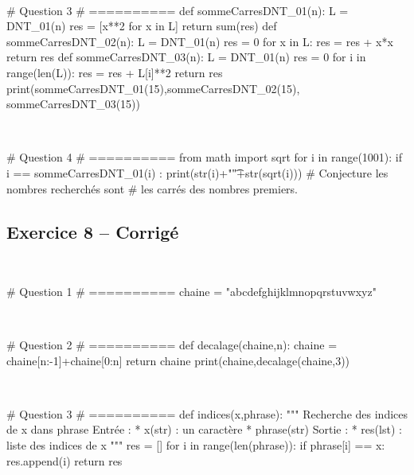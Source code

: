 \documentclass[10pt,fleqn]{article} %
\begin{document}
\begin{multicols}{2}
\begin{corrige}
$\quad$
\begin{python}
# Question 3
# ==========
def sommeCarresDNT_01(n):
    L = DNT_01(n)
    res = [x**2 for x in L]
    return sum(res)
def sommeCarresDNT_02(n):
    L = DNT_01(n)
    res = 0
    for x in L:
        res = res + x*x
    return res
def sommeCarresDNT_03(n):
    L = DNT_01(n)
    res = 0
    for i in range(len(L)):
        res = res + L[i]**2
    return res
print(sommeCarresDNT_01(15),sommeCarresDNT_02(15),
    sommeCarresDNT_03(15))
\end{python}
\end{corrige}


\begin{corrige}
$\quad$
\begin{python}
# Question 4
# ==========
from math import sqrt
for i in range(1001):
    if i == sommeCarresDNT_01(i) :
        print(str(i)+"\t"+str(sqrt(i)))
# Conjecture les nombres recherchés sont 
# les carrés des nombres premiers. 
\end{python}
\end{corrige}


\subsection*{Exercice 8 -- Corrigé}
\begin{corrige}
$\quad$
\begin{python}
# Question 1 
# ==========
chaine = "abcdefghijklmnopqrstuvwxyz"
\end{python}
\end{corrige}

\begin{corrige}
$\quad$
\begin{python}
# Question 2
# ==========
def decalage(chaine,n):
    chaine = chaine[n:-1]+chaine[0:n]
    return chaine
print(chaine,decalage(chaine,3))
\end{python}
\end{corrige}

\begin{corrige}
$\quad$
\begin{python}
# Question 3
# ==========
def indices(x,phrase):
    """
    Recherche des indices de x dans phrase
    Entrée : 
     * x(str) : un caractère
     * phrase(str)
    Sortie : 
     * res(lst) : liste des indices de x
    """
    res = []
    for i in range(len(phrase)):
        if phrase[i] == x:
            res.append(i)
    return res


\end{python}
\end{corrige}
\end{multicols}
\end{document}
